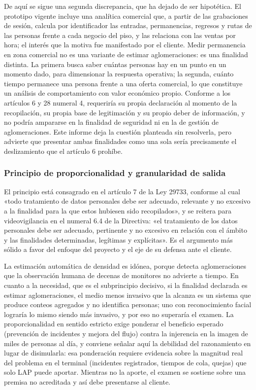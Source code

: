 De aquí se sigue una segunda discrepancia, que ha dejado de ser
hipotética. El prototipo vigente incluye una analítica comercial que, a partir
de las grabaciones de sesión, calcula por identificador las entradas,
permanencias, regresos y rutas de las personas frente a cada negocio del piso,
y las relaciona con las ventas por hora; el interés que la motiva fue
manifestado por el cliente. Medir permanencia en zona
comercial no es una variante de estimar aglomeraciones: es una finalidad
distinta. La primera busca saber cuántas personas hay en un punto en un
momento dado, para dimensionar la respuesta operativa; la segunda,
cuánto tiempo permanece una persona frente a una oferta comercial, lo
que constituye un análisis de comportamiento con valor económico propio.
Conforme a los artículos 6 y 28 numeral 4, requeriría su propia
declaración al momento de la recopilación, su propia base de
legitimación y su propio deber de información, y no podría ampararse en
la finalidad de seguridad ni en la de gestión de aglomeraciones. Este
informe deja la cuestión planteada sin resolverla, pero advierte que
presentar ambas finalidades como una sola sería precisamente el
deslizamiento que el artículo 6 prohíbe.

\subsubsection{Principio de proporcionalidad y granularidad de salida}

El principio está consagrado en el artículo 7 de la Ley 29733, conforme
al cual «todo tratamiento de datos personales debe ser adecuado,
relevante y no excesivo a la finalidad para la que estos hubiesen sido
recopilados», y se reitera para videovigilancia en el numeral 6.4 de la
Directiva: «el tratamiento de los datos personales debe ser adecuado,
pertinente y no excesivo en relación con el ámbito y las finalidades
determinadas, legítimas y explícitas». Es el argumento más sólido a
favor del enfoque del proyecto y el eje de su defensa ante el cliente.

La estimación automática de densidad es idónea, porque detecta
aglomeraciones que la observación humana de decenas de monitores no
advierte a tiempo. En cuanto a la necesidad, que es el subprincipio
decisivo, si la finalidad declarada es estimar aglomeraciones, el medio
menos invasivo que la alcanza es un sistema que produce conteos
agregados y no identifica personas; uno con reconocimiento facial
lograría lo mismo siendo más invasivo, y por eso no superaría el examen.
La proporcionalidad en sentido estricto exige ponderar el beneficio
esperado (prevención de incidentes y mejora del flujo) contra la
injerencia en la imagen de miles de personas al día, y conviene señalar
aquí la debilidad del razonamiento en lugar de disimularla: esa
ponderación requiere evidencia sobre la magnitud real del problema en el
terminal (incidentes registrados, tiempos de cola, quejas) que solo LAP
puede aportar. Mientras no la aporte, el examen se sostiene sobre una
premisa no acreditada y así debe presentarse al cliente.

